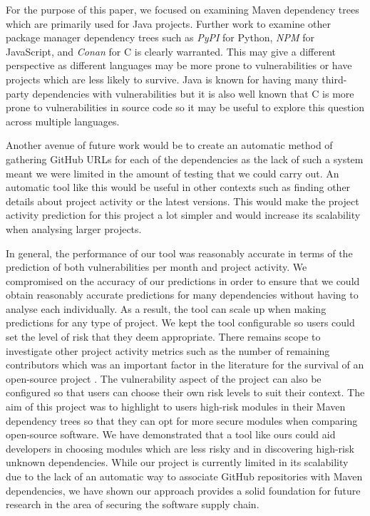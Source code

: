 \documentclass[conference]{IEEEtran}
\begin{document}
For the purpose of this paper, we focused on examining Maven dependency trees which are primarily used for Java projects. Further work to examine other package manager dependency trees such as \textit{PyPI} for Python, \textit{NPM} for JavaScript, and \textit{Conan} for C is clearly warranted. This may give a different perspective as different languages may be more prone to vulnerabilities or have projects which are less likely to survive. Java is known for having many third-party dependencies with vulnerabilities but it is also well known that C is more prone to vulnerabilities in source code so it may be useful to explore this question across multiple languages. 

Another avenue of future work would be to create an automatic method of gathering GitHub URLs for each of the dependencies as the lack of such a system meant we were limited in the amount of testing that we could carry out. An automatic tool like this would be useful in other contexts such as finding other details about project activity or the latest versions. This would make the project activity prediction for this project a lot simpler and would increase its scalability when analysing larger projects. 

In general, the performance of our tool was reasonably accurate in terms of the prediction of both vulnerabilities per month and project activity. We compromised on the accuracy of our predictions in order to ensure that we could obtain reasonably accurate predictions for many dependencies without having to analyse each individually. As a result, the tool can scale up when making predictions for any type of project. We kept the tool configurable so users could set the level of risk that they deem appropriate. There remains scope to investigate other project activity metrics such as the number of remaining contributors which was an important factor in the literature for the survival of an open-source project \cite{l_bao_large_2021}. The vulnerability aspect of the project can also be configured so that users can choose their own risk levels to suit their context. The aim of this project was to highlight to users high-risk modules in their Maven dependency trees so that they can opt for more secure modules when comparing open-source software. We have demonstrated that a tool like ours could aid developers in choosing modules which are less risky and in discovering high-risk unknown dependencies. While our project is currently limited in its scalability due to the lack of an automatic way to associate GitHub repositories with Maven dependencies, we have shown our approach provides a solid foundation for future research in the area of securing the software supply chain. 
\end{document}
